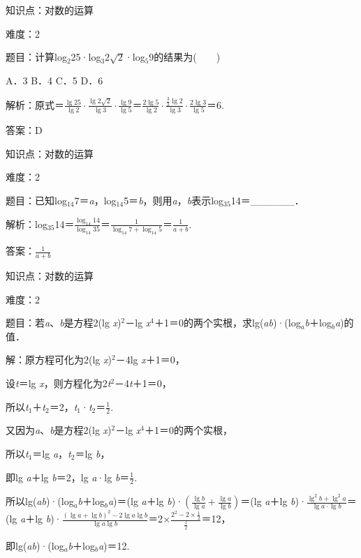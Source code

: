 \documentclass{article} %
\begin{document}
知识点：对数的运算

难度：2

题目：计算log${}_{2}$25·log${}_{3}$$2\sqrt{2}$·log${}_{5}$9的结果为(　　)

A．3  B．4  C．5  D．6

解析：原式＝$\frac{\lg25}{\lg2}·\frac{\lg2\sqrt{2}}{\lg3}·\frac{\lg9}{\lg5}$＝$\frac{2\lg5}{\lg2}·\frac{\frac{3}{2}\lg2}{\lg3}·\frac{2\lg3}{\lg5}$＝6.

答案：D

知识点：对数的运算

难度：2

题目：已知log${}_{14}$7＝\textit{a}，log${}_{14}$5＝\textit{b}，则用\textit{a}，\textit{b}表示log${}_{35}$14＝\_\_\_\_\_\_．

解析：log${}_{35}$14＝$\frac{\log_{14} 14}{\log_{14} 35}$＝$\frac{1}{\log_{14} 7+\log_{14} 5}$＝$\frac{1}{a+b}$.

答案：$\frac{1}{a+b}$

知识点：对数的运算

难度：2

题目：若\textit{a}、\textit{b}是方程2(lg \textit{x})${}^{2}$－lg \textit{x}${}^{4}$＋1＝0的两个实根，求lg(\textit{ab})·(log\textit{${}_{a}$b}＋log\textit{${}_{b}$a})的值．

解：原方程可化为2(lg \textit{x})${}^{2}$－4lg \textit{x}＋1＝0，

设\textit{t}＝lg \textit{x}，则方程化为2\textit{t}${}^{2}$－4\textit{t}＋1＝0，

所以\textit{t}${}_{1}$＋\textit{t}${}_{2}$＝2，\textit{t}${}_{1}$·\textit{t}${}_{2}$＝$\frac{1}{2}$.

又因为\textit{a}、\textit{b}是方程2(lg \textit{x})${}^{2}$－lg \textit{x}${}^{4}$＋1＝0的两个实根，

所以\textit{t}${}_{1}$＝lg \textit{a}，\textit{t}${}_{2}$＝lg \textit{b}，

即lg \textit{a}＋lg \textit{b}＝2，lg \textit{a}·lg \textit{b}＝$\frac{1}{2}$.

所以lg(\textit{ab})·(log\textit{${}_{a}$b}＋log\textit{${}_{b}$a})＝(lg \textit{a}＋lg \textit{b})·$(\frac{\lg b}{\lg a}+\frac{\lg a}{\lg b})$＝(lg \textit{a}＋lg \textit{b})·$\frac{\lg^{2} b+\lg^{2} a}{\lg a·\lg b}$＝(lg \textit{a}＋lg \textit{b})·$\frac{(\lg a+\lg b)^{2}-2\lg a\lg b}{\lg a\lg b}$＝2$\mathrm{\times}$$\frac{2^{2}-2\times\frac{1}{2}}{\frac{1}{2}}$＝12，

即lg(\textit{ab})·(log\textit{${}_{a}$b}＋log\textit{${}_{b}$a})＝12.
\end{document}
